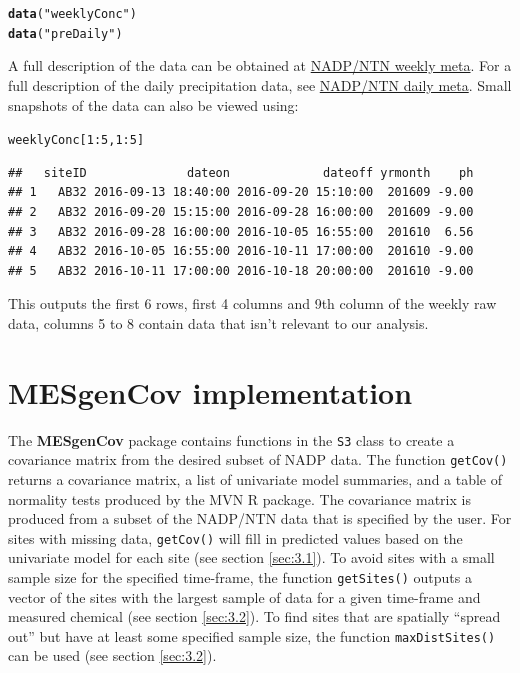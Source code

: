 \documentclass[11pt]{article}\usepackage[]{graphicx}\usepackage[]{color}
\makeatletter
\newcommand{\hlnum}[1]{\textcolor[rgb]{0.686,0.059,0.569}{#1}}%
\newcommand{\hlstr}[1]{\textcolor[rgb]{0.192,0.494,0.8}{#1}}%
\newcommand{\hlopt}[1]{\textcolor[rgb]{0,0,0}{#1}}%
\newcommand{\hlstd}[1]{\textcolor[rgb]{0.345,0.345,0.345}{#1}}%
\newcommand{\hlkwd}[1]{\textcolor[rgb]{0.737,0.353,0.396}{\textbf{#1}}}%
\newenvironment{kframe}{%
 \def\at@end@of@kframe{}%
 \ifinner\ifhmode%
  \def\at@end@of@kframe{\end{minipage}}%
  \begin{minipage}{\columnwidth}%
 \fi\fi%
 \def\FrameCommand##1{\hskip\@totalleftmargin \hskip-\fboxsep
 \colorbox{shadecolor}{##1}\hskip-\fboxsep
     \hskip-\linewidth \hskip-\@totalleftmargin \hskip\columnwidth}%
 \MakeFramed {\advance\hsize-\width
   \@totalleftmargin\z@ \linewidth\hsize
   \@setminipage}}%
 {\par\unskip\endMakeFramed%
 \at@end@of@kframe}
\newenvironment{knitrout}{}{} %
\makeatother
\begin{document}
\begin{knitrout}
\color{fgcolor}\begin{kframe}
\begin{alltt}
 \hlkwd{data}\hlstd{(}\hlstr{"weeklyConc"}\hlstd{)}
 \hlkwd{data}\hlstd{(}\hlstr{"preDaily"}\hlstd{)}
\end{alltt}
\end{kframe}
\end{knitrout}

A full description of the data can be obtained at \href{http://NADP.slh.wisc.edu/data/ntn/meta/ntn-weekly-Meta.pdf}{NADP/NTN weekly meta}. For a full description of the daily precipitation data, see \href{http://NADP.slh.wisc.edu/data/ntn/meta/ntn-daily-Meta.pdf}{NADP/NTN daily meta}. Small snapshots of the data can also be viewed using:

\begin{knitrout}
\color{fgcolor}\begin{kframe}
\begin{alltt}
  \hlstd{weeklyConc[}\hlnum{1}\hlopt{:}\hlnum{5}\hlstd{,}\hlnum{1}\hlopt{:}\hlnum{5}\hlstd{]}
\end{alltt}
\begin{verbatim}
##   siteID              dateon             dateoff yrmonth    ph
## 1   AB32 2016-09-13 18:40:00 2016-09-20 15:10:00  201609 -9.00
## 2   AB32 2016-09-20 15:15:00 2016-09-28 16:00:00  201609 -9.00
## 3   AB32 2016-09-28 16:00:00 2016-10-05 16:55:00  201610  6.56
## 4   AB32 2016-10-05 16:55:00 2016-10-11 17:00:00  201610 -9.00
## 5   AB32 2016-10-11 17:00:00 2016-10-18 20:00:00  201610 -9.00
\end{verbatim}
\end{kframe}
\end{knitrout}

This outputs the first 6 rows, first 4 columns and 9th column of the weekly raw data, columns 5 to 8 contain data that isn't relevant to our analysis.
\section{MESgenCov implementation}

 The \textbf{MESgenCov} package contains functions in the \texttt{S3} class to create a covariance matrix from the desired subset of NADP data. The function \verb;getCov(); returns a covariance matrix, a list of univariate model summaries, and a table of normality tests produced by the MVN R package. The covariance matrix is produced from a subset of the NADP/NTN data that is specified by the user. For sites with missing data, \verb;getCov(); will fill in predicted values based on the univariate model for each site (see section \ref{sec:3.1}). To avoid sites with a small sample size for the specified time-frame, the function \verb;getSites(); outputs a vector of the sites with the largest sample of data for a given time-frame and measured chemical (see section \ref{sec:3.2}). To find sites that are spatially ``spread out'' but have at least some specified sample size, the function \verb;maxDistSites(); can be used (see section \ref{sec:3.2}).
\end{document}
